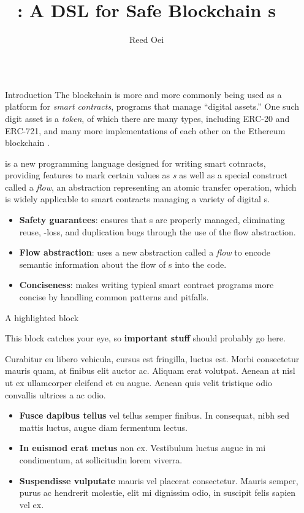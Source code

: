 \documentclass[usenames, dvipsnames, final]{beamer}
\title{\langName: A DSL for Safe Blockchain \AssetTxt{}s}
\author{Reed Oei}
\institute[shortinst]{University of Illinois at Urbana-Champaign}
\newlength{\sepwidth}
\newlength{\colwidth}
\newcommand{\separatorcolumn}{\begin{column}{\sepwidth}\end{column}}
\begin{document}
\begin{frame}[t]
\begin{columns}[t]
\separatorcolumn

\begin{column}{\colwidth}

  \begin{block}{Introduction}
      The blockchain is more and more commonly being used as a platform for \emph{smart contracts}, programs that manage ``digital assets.'' 
      One such digit asset is a \emph{token}, of which there are many types, including ERC-20 and ERC-721, and many more implementations of each other on the Ethereum blockchain .

      \langName is a new programming language designed for writing smart cotnracts, providing features to mark certain values as \emph{\assetTxt{}s} as well as a special construct called a \emph{flow}, an abstraction representing an atomic transfer operation, which is widely applicable to smart contracts managing a variety of digital \assetTxt{}s.

      \begin{itemize}
          \item \textbf{Safety guarantees}: \langName ensures that \assetTxt{}s are properly managed, eliminating reuse, \assetTxt-loss, and duplication bugs through the use of the flow abstraction.
          \item \textbf{Flow abstraction}: \langName uses a new abstraction called a \emph{flow} to encode semantic information about the flow of \assetTxt{}s into the code.
          \item \textbf{Conciseness}: \langName makes writing typical smart contract programs more concise by handling common patterns and pitfalls.
      \end{itemize}
  \end{block}

  \begin{alertblock}{A highlighted block}

    This block catches your eye, so \textbf{important stuff} should probably go
    here.

    Curabitur eu libero vehicula, cursus est fringilla, luctus est. Morbi
    consectetur mauris quam, at finibus elit auctor ac. Aliquam erat volutpat.
    Aenean at nisl ut ex ullamcorper eleifend et eu augue. Aenean quis velit
    tristique odio convallis ultrices a ac odio.

    \begin{itemize}
      \item \textbf{Fusce dapibus tellus} vel tellus semper finibus. In
        consequat, nibh sed mattis luctus, augue diam fermentum lectus.
      \item \textbf{In euismod erat metus} non ex. Vestibulum luctus augue in
        mi condimentum, at sollicitudin lorem viverra.
      \item \textbf{Suspendisse vulputate} mauris vel placerat consectetur.
        Mauris semper, purus ac hendrerit molestie, elit mi dignissim odio, in
        suscipit felis sapien vel ex.
    \end{itemize}


\end{alertblock}
\end{column}
\end{columns}
\end{frame}
\end{document}

